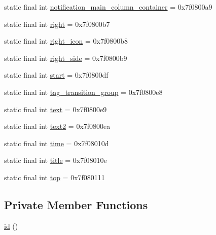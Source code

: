 \begin{DoxyCompactItemize}
\item 
static final int \mbox{\hyperlink{classandroid_1_1support_1_1graphics_1_1drawable_1_1animated_1_1_r_1_1id_a4659cfd56c99a93058be66facd12160d}{notification\+\_\+main\+\_\+column\+\_\+container}} = 0x7f0800a9
\item 
static final int \mbox{\hyperlink{classandroid_1_1support_1_1graphics_1_1drawable_1_1animated_1_1_r_1_1id_ae3d1db8c98a47c61bdc2984c578892e8}{right}} = 0x7f0800b7
\item 
static final int \mbox{\hyperlink{classandroid_1_1support_1_1graphics_1_1drawable_1_1animated_1_1_r_1_1id_a5289728033dea722cd93a2a5d2c36ed5}{right\+\_\+icon}} = 0x7f0800b8
\item 
static final int \mbox{\hyperlink{classandroid_1_1support_1_1graphics_1_1drawable_1_1animated_1_1_r_1_1id_aa9ac842f968caa43f844db5381d766ba}{right\+\_\+side}} = 0x7f0800b9
\item 
static final int \mbox{\hyperlink{classandroid_1_1support_1_1graphics_1_1drawable_1_1animated_1_1_r_1_1id_a4fc25752e74520b8034ec85efb8133d4}{start}} = 0x7f0800df
\item 
static final int \mbox{\hyperlink{classandroid_1_1support_1_1graphics_1_1drawable_1_1animated_1_1_r_1_1id_a9a44132e906214f9e2ed43c3c076abad}{tag\+\_\+transition\+\_\+group}} = 0x7f0800e8
\item 
static final int \mbox{\hyperlink{classandroid_1_1support_1_1graphics_1_1drawable_1_1animated_1_1_r_1_1id_a771d3997393be396d7354a30b1a1ee64}{text}} = 0x7f0800e9
\item 
static final int \mbox{\hyperlink{classandroid_1_1support_1_1graphics_1_1drawable_1_1animated_1_1_r_1_1id_a9d7004b820a452d0cecbbb2e1a7655f7}{text2}} = 0x7f0800ea
\item 
static final int \mbox{\hyperlink{classandroid_1_1support_1_1graphics_1_1drawable_1_1animated_1_1_r_1_1id_a4c656a6a67db97db501a35937f7981a6}{time}} = 0x7f08010d
\item 
static final int \mbox{\hyperlink{classandroid_1_1support_1_1graphics_1_1drawable_1_1animated_1_1_r_1_1id_a47a3e5ab1364d8adba942674f7c407ad}{title}} = 0x7f08010e
\item 
static final int \mbox{\hyperlink{classandroid_1_1support_1_1graphics_1_1drawable_1_1animated_1_1_r_1_1id_a9ba6768ae53717c0d6be15c41b3d19ae}{top}} = 0x7f080111
\end{DoxyCompactItemize}
\subsection*{Private Member Functions}
\begin{DoxyCompactItemize}
\item 
\mbox{\hyperlink{classandroid_1_1support_1_1graphics_1_1drawable_1_1animated_1_1_r_1_1id_a0bef099891978ee841daee05d4e127aa}{id}} ()
\end{DoxyCompactItemize}


